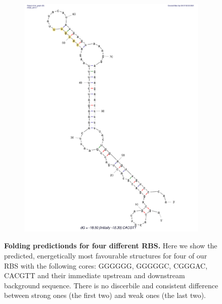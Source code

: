 \begin{figure}[!ht]
\begin{subfigure}[b]{0.49\textwidth}
        \includegraphics[scale=0.25]{plots/Supplementary/Structure_CACGTT.pdf}
        \label{fig:CACGTT}
    \end{subfigure}
       \caption{\textbf{Folding predictionds for four different RBS.} Here we show the predicted, energetically most favourable structures for four of our RBS with the following cores: GGGGGG, GGGGGC, CGGGAC, CACGTT and their immediate upstream and downstream background sequence. There is no discerbile and consistent difference between strong ones (the first two) and weak ones (the last two).}
       \label{fig:structures}
\end{figure}



